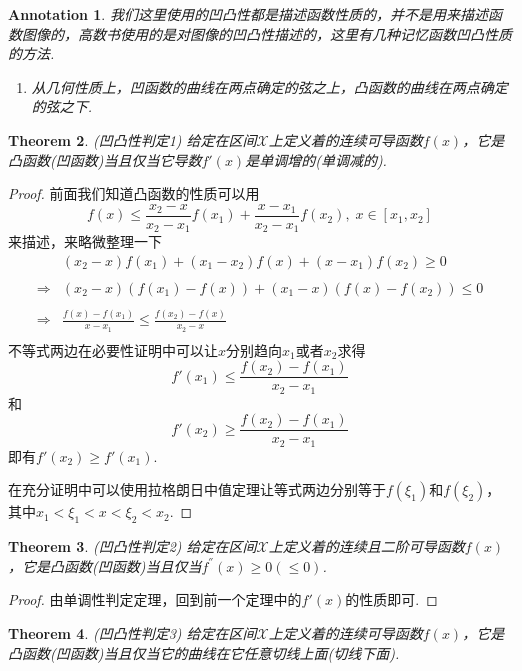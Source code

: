 \documentclass{article}
\newtheorem{theorem}{Theorem}[section]
\newtheorem{annotation}[theorem]{Annotation}
\begin{document}
\begin{annotation}
\rm 我们这里使用的凹凸性都是描述函数性质的，并不是用来描述函数图像的，{\color{red}高数书使用的是对图像的凹凸性描述的}，这里有几种记忆函数凹凸性质的方法.
\begin{enumerate}
	\item 从几何性质上，凹函数的曲线在两点确定的弦之上，凸函数的曲线在两点确定的弦之下.
\end{enumerate}	
\end{annotation}

\begin{theorem}
\rm {\color{red} (凹凸性判定1)} 给定在区间$\mathcal{X}$上定义着的连续可导函数$f(x)$，它是凸函数(凹函数)当且仅当它导数$f'(x)$是单调增的(单调减的). 
\end{theorem}

\begin{proof}
前面我们知道凸函数的性质可以用
$$
f(x) \leq \frac{x_2 - x}{x_2-x_1}f(x_1) + \frac{x-x_1}{x_2-x_1}f(x_2),\; x \in [x_1,x_2]
$$
来描述，来略微整理一下
$$
\begin{array}{ll}
&(x_2-x)f(x_1) + (x_1-x_2)f(x) + (x-x_1)f(x_2) \geq 0 \\ \\
\Rightarrow & (x_2 - x)(f(x_1)-f(x)) + (x_1 -x)(f(x)-f(x_2)) \leq  0 \\ \\
\Rightarrow & \frac{f(x) - f(x_1)}{x -x_1} \leq \frac{f(x_2) - f(x)}{x_2 - x} \\
\end{array}
$$
不等式两边在必要性证明中可以让$x$分别趋向$x_1$或者$x_2$求得
$$
f'(x_1) \leq \frac{f(x_2) - f(x_1)}{x_2 - x_1}
$$
和 
$$
f'(x_2) \geq \frac{f(x_2) - f(x_1)}{x_2 - x_1} 
$$
即有$f'(x_2) \geq f'(x_1)$.

在充分证明中可以使用拉格朗日中值定理让等式两边分别等于$f(\xi_1)$和$f(\xi_2)$，其中$x_1 < \xi_1 < x < \xi_2 < x_2$.
\end{proof}


\begin{theorem}
\rm {\color{red} (凹凸性判定2)} 给定在区间$\mathcal{X}$上定义着的连续且二阶可导函数$f(x)$，它是凸函数(凹函数)当且仅当$f^{''}(x) \geq 0(\leq 0)$.
\end{theorem}

\begin{proof}
由单调性判定定理，回到前一个定理中的$f'(x)$的性质即可.
\end{proof}

\begin{theorem}
\rm {\color{red} (凹凸性判定3)} 给定在区间$\mathcal{X}$上定义着的连续可导函数$f(x)$，它是凸函数(凹函数)当且仅当它的曲线在它任意切线上面(切线下面).
\end{theorem}
\end{document}
